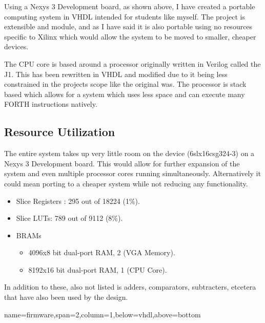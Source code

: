 \documentclass[a1paper,portrait]{baposter}
\begin{document}
\begin{poster}
{Using a Nexys 3 Development board\cite{nexysDigilent}, as shown above,
I have created a portable computing system in VHDL intended for students
like myself. The project is extensible and module, and as I have said
it is also portable using no resources specific to Xilinx which would
allow the system to be moved to smaller, cheaper devices.

The CPU core is based around a processor originally written in Verilog
called the J1\cite{j1core}. This has been rewritten in VHDL and modified
due to it being less constrained in the projects scope like the original
was. The processor is stack based which allows for a system which uses
less space and can execute many FORTH instructions natively.

\subsection{Resource Utilization}
The entire system takes up very little room on the device (6slx16csg324-3)
on a Nexys 3 Development board. This would allow for further expansion of
the system and even multiple processor cores running simultaneously. Alternatively
it could mean porting to a cheaper system while not reducing any functionality.
\begin{center}
    \begin{itemize}
        \item Slice Registers : 295 out of 18224 (1\%).
        \item Slice LUTs: 789 out of 9112 (8\%).
        \item BRAMs 
            \begin{itemize}
                \item 4096x8 bit dual-port RAM, 2 (VGA Memory).
                \item 8192x16 bit dual-port RAM, 1 (CPU Core).
            \end{itemize}
    \end{itemize}
\end{center}

In addition to these, also not listed is adders, comparators, subtracters, etcetera 
that have also been used by the design.

% 

}

{name=firmware,span=2,column=1,below=vhdl,above=bottom}{
\smaller

}
\end{poster}
\end{document}
